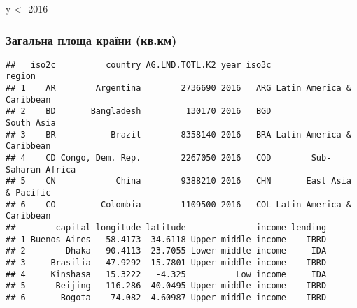\documentclass[
]{article}
\newenvironment{Shaded}{\begin{snugshade}}{\end{snugshade}}
\newcommand{\DataTypeTok}[1]{\textcolor[rgb]{0.13,0.29,0.53}{#1}}
\newcommand{\DecValTok}[1]{\textcolor[rgb]{0.00,0.00,0.81}{#1}}
\newcommand{\KeywordTok}[1]{\textcolor[rgb]{0.13,0.29,0.53}{\textbf{#1}}}
\newcommand{\NormalTok}[1]{#1}
\newcommand{\OperatorTok}[1]{\textcolor[rgb]{0.81,0.36,0.00}{\textbf{#1}}}
\newcommand{\OtherTok}[1]{\textcolor[rgb]{0.56,0.35,0.01}{#1}}
\newcommand{\StringTok}[1]{\textcolor[rgb]{0.31,0.60,0.02}{#1}}
\begin{document}
\begin{Shaded}
\begin{Highlighting}[]
\NormalTok{y <-}\StringTok{ }\DecValTok{2016}
\end{Highlighting}
\end{Shaded}

\hypertarget{ux437ux430ux433ux430ux43bux44cux43dux430-ux43fux43bux43eux449ux430-ux43aux440ux430ux457ux43dux438-ux43aux432.ux43aux43c}{%
\subsubsection{Загальна площа країни
(кв.км)}\label{ux437ux430ux433ux430ux43bux44cux43dux430-ux43fux43bux43eux449ux430-ux43aux440ux430ux457ux43dux438-ux43aux432.ux43aux43c}}

\begin{Shaded}
\end{Shaded}

\begin{verbatim}
##   iso2c          country AG.LND.TOTL.K2 year iso3c                    region
## 1    AR        Argentina        2736690 2016   ARG Latin America & Caribbean
## 2    BD       Bangladesh         130170 2016   BGD                South Asia
## 3    BR           Brazil        8358140 2016   BRA Latin America & Caribbean
## 4    CD Congo, Dem. Rep.        2267050 2016   COD        Sub-Saharan Africa
## 5    CN            China        9388210 2016   CHN       East Asia & Pacific
## 6    CO         Colombia        1109500 2016   COL Latin America & Caribbean
##        capital longitude latitude              income lending
## 1 Buenos Aires  -58.4173 -34.6118 Upper middle income    IBRD
## 2        Dhaka   90.4113  23.7055 Lower middle income     IDA
## 3     Brasilia  -47.9292 -15.7801 Upper middle income    IBRD
## 4     Kinshasa   15.3222   -4.325          Low income     IDA
## 5      Beijing   116.286  40.0495 Upper middle income    IBRD
## 6       Bogota   -74.082  4.60987 Upper middle income    IBRD
\end{verbatim}
\end{document}
